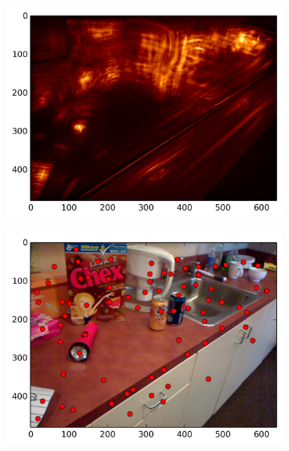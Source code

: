 \begin{figure}[ht]
\centering
\begin{subfigure}[]{0.25\linewidth}\label{fig:kit_smag_0}\includegraphics[width=\linewidth]{figures/kitchen_smag_1}\end{subfigure}%
\begin{subfigure}[]{0.25\linewidth}\label{fig:kit_feats_0}\includegraphics[width=\linewidth]{figures/kitchen_feats_1}\end{subfigure}%

\end{figure}
